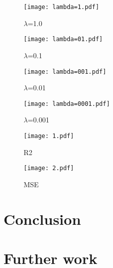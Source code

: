 \documentclass[10pt]{article}
\begin{document}
\begin{figure}
	\centerline{\texttt{[image: lambda=1.pdf]}}
	\caption{$\lambda$=1.0}
	\label{plt:lamda1}
\end{figure}

\begin{figure}
	\centerline{\texttt{[image: lambda=01.pdf]}}
	\caption{$\lambda$=0.1}
	\label{plt:lamda01}
\end{figure}

\begin{figure}
	\centerline{\texttt{[image: lambda=001.pdf]}}
	\caption{$\lambda$=0.01}
	\label{plt:lamda001}
\end{figure}

\begin{figure}
	\centerline{\texttt{[image: lambda=0001.pdf]}}
	\caption{$\lambda$=0.001}
	\label{plt:lamda0001}
\end{figure}

\begin{figure}
	\centerline{\texttt{[image: 1.pdf]}}
	\caption{R2}
	\label{plt:R2"}
\end{figure}

\begin{figure}
	\centerline{\texttt{[image: 2.pdf]}}
	\caption{MSE}
	\label{plt:MSE"}
\end{figure}


\section{Conclusion}

\section{Further work}
\end{document}
